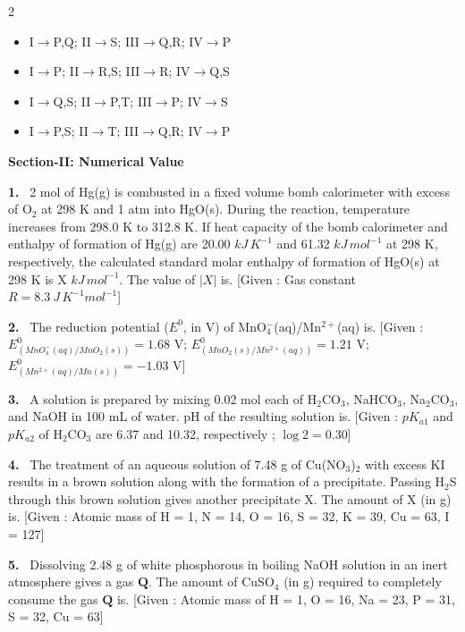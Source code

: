 \documentclass[10pt]{extarticle}
\newcommand{\sect}[1]{\par\smallskip\noindent\textbf{#1}\par}
\newcommand{\qn}[1]{\par\smallskip\noindent\textbf{#1.}~}
\newenvironment{qoptions}{\begin{itemize}[leftmargin=1.8em,itemsep=1pt,topsep=2pt,label={}]}{\end{itemize}}
\newcommand{\opt}[2]{\item[(#1)] #2}
\begin{document}
\begin{multicols}{2}
\begin{qoptions}
\opt{A}{I$\to$P,Q; II$\to$S; III$\to$Q,R; IV$\to$P}
\opt{B}{I$\to$P; II$\to$R,S; III$\to$R; IV$\to$Q,S}
\opt{C}{I$\to$Q,S; II$\to$P,T; III$\to$P; IV$\to$S}
\opt{D}{I$\to$P,S; II$\to$T; III$\to$Q,R; IV$\to$P}
\end{qoptions}

\sect{Section-II: Numerical Value}

\qn{1} 2 mol of Hg(g) is combusted in a fixed volume bomb calorimeter with excess of O$_2$ at 298 K and 1 atm into HgO(s). During the reaction, temperature increases from 298.0 K to 312.8 K. If heat capacity of the bomb calorimeter and enthalpy of formation of Hg(g) are 20.00 $kJ\,K^{-1}$ and 61.32 $kJ\,mol^{-1}$ at 298 K, respectively, the calculated standard molar enthalpy of formation of HgO(s) at 298 K is X $kJ\,mol^{-1}$. The value of $|X|$ is\underline{\hspace{2em}}.
[Given : Gas constant $R = 8.3\ J\,K^{-1}mol^{-1}$]

\qn{2} The reduction potential ($E^0$, in V) of MnO$_4^-$(aq)/Mn$^{2+}$(aq) is\underline{\hspace{2em}}.
[Given : $E^0_{(MnO_4^-(aq)/MnO_2(s))} = 1.68$ V; $E^0_{(MnO_2(s)/Mn^{2+}(aq))} = 1.21$ V; $E^0_{(Mn^{2+}(aq)/Mn(s))} = -1.03$ V]

\qn{3} A solution is prepared by mixing 0.02 mol each of H$_2$CO$_3$, NaHCO$_3$, Na$_2$CO$_3$, and NaOH in 100 mL of water. pH of the resulting solution is\underline{\hspace{2em}}.
[Given : $pK_{a1}$ and $pK_{a2}$ of H$_2$CO$_3$ are 6.37 and 10.32, respectively ; $\log 2 = 0.30$]

\qn{4} The treatment of an aqueous solution of 7.48 g of Cu(NO$_3$)$_2$ with excess KI results in a brown solution along with the formation of a precipitate. Passing H$_2$S through this brown solution gives another precipitate X. The amount of X (in g) is\underline{\hspace{2em}}.
[Given : Atomic mass of H = 1, N = 14, O = 16, S = 32, K = 39, Cu = 63, I = 127]

\qn{5} Dissolving 2.48 g of white phosphorous in boiling NaOH solution in an inert atmosphere gives a gas $\mathbf{Q}$. The amount of CuSO$_4$ (in g) required to completely consume the gas $\mathbf{Q}$ is\underline{\hspace{2em}}.
[Given : Atomic mass of H = 1, O = 16, Na = 23, P = 31, S = 32, Cu = 63]


\end{multicols}
\end{document}
